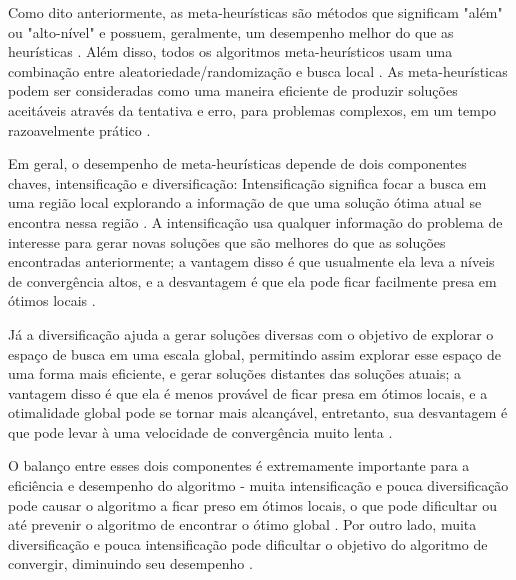 
Como dito anteriormente, as meta-heurísticas são métodos que significam "além" ou "alto-nível" e possuem, geralmente, um desempenho melhor do que as heurísticas \cite{yang}. Além disso, todos os algoritmos meta-heurísticos usam uma combinação entre aleatoriedade/randomização e busca local \cite{yang}. As meta-heurísticas podem ser consideradas como uma maneira eficiente de produzir soluções aceitáveis através da tentativa e erro, para problemas complexos, em um tempo razoavelmente prático \cite{yang2}.

Em geral, o desempenho de meta-heurísticas depende de dois componentes chaves, intensificação e diversificação: Intensificação significa focar a busca em uma região local explorando a informação de que uma solução ótima atual se encontra nessa região \cite{sahib}. A intensificação usa qualquer informação do problema de interesse para gerar novas soluções que são melhores do que as soluções encontradas anteriormente; a vantagem disso é que usualmente ela leva a níveis de convergência altos, e a desvantagem é que ela pode ficar facilmente presa em ótimos locais \cite{sahib}. 

Já a diversificação ajuda a gerar soluções diversas com o objetivo de explorar o espaço de busca em uma escala global, permitindo assim explorar esse espaço de uma forma mais eficiente, e gerar soluções distantes das soluções atuais; a vantagem disso é que ela é menos provável de ficar presa em ótimos locais, e a otimalidade global pode se tornar mais alcançável, entretanto, sua desvantagem é que pode levar à uma velocidade de convergência muito lenta \cite{sahib}.

O balanço entre esses dois componentes é extremamente importante para a eficiência e desempenho do algoritmo - muita intensificação e pouca diversificação pode causar o algoritmo a ficar preso em ótimos locais, o que pode dificultar ou até prevenir o algoritmo de encontrar o ótimo global \cite{yang2}. Por outro lado, muita diversificação e pouca intensificação pode dificultar o objetivo do algoritmo de convergir, diminuindo seu desempenho \cite{yang2}.

